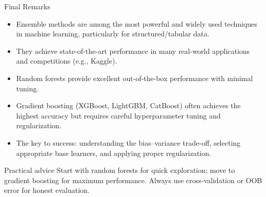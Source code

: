 \begin{frame}{Final Remarks}
  \begin{itemize}
    \item \alert{Ensemble methods} are among the most powerful and widely used techniques in
          machine learning, particularly for structured/tabular data.
    \item They achieve state-of-the-art performance in many real-world applications and
          competitions (e.g., Kaggle).
    \item \alert{Random forests} provide excellent out-of-the-box performance with minimal tuning.
    \item \alert{Gradient boosting} (XGBoost, LightGBM, CatBoost) often achieves the highest
          accuracy but requires careful hyperparameter tuning and regularization.
    \item The key to success: understanding the bias--variance trade-off, selecting appropriate
          base learners, and applying proper regularization.
  \end{itemize}
  \begin{block}{Practical advice}
    Start with random forests for quick exploration; move to gradient boosting for maximum
    performance. Always use cross-validation or OOB error for honest evaluation.
  \end{block}
\end{frame}

%
